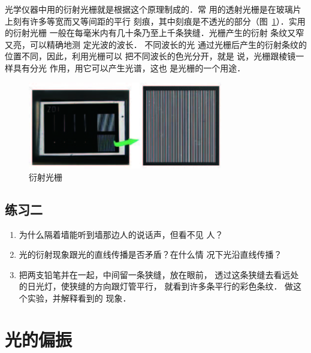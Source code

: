 光学仪器中用的衍射光栅就是根据这个原理制成的．常
用的透射光栅是在玻璃片上刻有许多等宽而又等间距的平行
刻痕，其中刻痕是不透光的部分（图~\ref{fig_C_6-10}）．实用的衍射光栅
一般在每毫米内有几十条乃至上千条狭缝．光栅产生的衍射
条纹又窄又亮，可以精确地测
定光波的波长．
不同波长的光
通过光栅后产生的衍射条纹的
位置不同，因此，利用光栅可以
把不同波长的色光分开，就是
说，光栅跟棱镜一样具有分光
作用，用它可以产生光谱，这也
是光栅的一个用途．
\begin{figure}[htbp]
    \centering
    \includegraphics[height=3.8cm]{fig/C/6-10.jpg}
    \caption{衍射光栅}\label{fig_C_6-10}
\end{figure}

\subsection*{练习二}
\begin{enumerate}
\item 为什么隔着墙能听到墙那边人的说话声，但看不见
人？
\item 光的衍射现象跟光的直线传播是否矛盾？在什么情
况下光沿直线传播？
\item 把两支铅笔并在一起，中间留一条狭缝，放在眼前，
透过这条狭缝去看远处的日光灯，使狭缝的方向跟灯管平行，
就看到许多条平行的彩色条纹．
做这个实验，并解释看到的
现象．
\end{enumerate}

\section{光的偏振}

